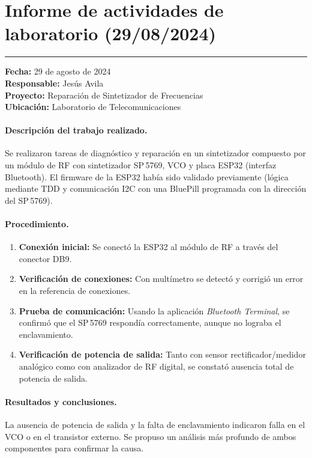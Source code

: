 \documentclass[12pt, a4paper]{article}
\begin{document}
	\section{Informe de actividades de laboratorio (29/08/2024)}
	\label{anx:informe_lab}
	
	
	\bigskip
	\noindent\rule{\textwidth}{0.4pt}
	
	\textbf{Fecha:} 29 de agosto de 2024\\
	\textbf{Responsable:} Jesús Avila\\
	\textbf{Proyecto:} Reparación de Sintetizador de Frecuencias\\
	\textbf{Ubicación:} Laboratorio de Telecomunicaciones
	
	\paragraph{Descripción del trabajo realizado.}
	Se realizaron tareas de diagnóstico y reparación en un sintetizador compuesto por un módulo de RF
	con sintetizador SP\,5769, VCO y placa ESP32 (interfaz Bluetooth). El firmware de la ESP32 había
	sido validado previamente (lógica mediante TDD y comunicación I2C con una BluePill programada con
	la dirección del SP\,5769).
	
	\paragraph{Procedimiento.}
	\begin{enumerate}[leftmargin=*, label=\textbf{\arabic*.}]
		\item \textbf{Conexión inicial:} Se conectó la ESP32 al módulo de RF a través del conector DB9.
		\item \textbf{Verificación de conexiones:} Con multímetro se detectó y corrigió un error en la
		referencia de conexiones.
		\item \textbf{Prueba de comunicación:} Usando la aplicación \textit{Bluetooth Terminal}, se confirmó
		que el SP\,5769 respondía correctamente, aunque no lograba el enclavamiento.
		\item \textbf{Verificación de potencia de salida:} Tanto con sensor rectificador/medidor analógico
		como con analizador de RF digital, se constató ausencia total de potencia de salida.
	\end{enumerate}
	
	\paragraph{Resultados y conclusiones.}
	La ausencia de potencia de salida y la falta de enclavamiento indicaron falla en el VCO o en el
	transistor externo. Se propuso un análisis más profundo de ambos componentes para confirmar la causa.
	
\end{document}
